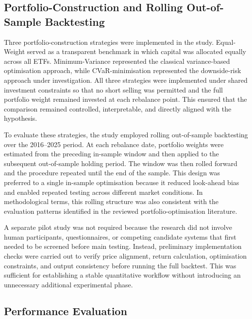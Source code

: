 \subsection{Portfolio-Construction and Rolling Out-of-Sample Backtesting}

\par Three portfolio-construction strategies were implemented in the study. Equal-Weight served as a transparent benchmark in which capital was allocated equally across all ETFs. Minimum-Variance represented the classical variance-based optimisation approach, while CVaR-minimisation represented the downside-risk approach under investigation. All three strategies were implemented under shared investment constraints so that no short selling was permitted and the full portfolio weight remained invested at each rebalance point. This ensured that the comparison remained controlled, interpretable, and directly aligned with the hypothesis.
\par To evaluate these strategies, the study employed rolling out-of-sample backtesting over the 2016–2025 period. At each rebalance date, portfolio weights were estimated from the preceding in-sample window and then applied to the subsequent out-of-sample holding period. The window was then rolled forward and the procedure repeated until the end of the sample. This design was preferred to a single in-sample optimisation because it reduced look-ahead bias and enabled repeated testing across different market conditions. In methodological terms, this rolling structure was also consistent with the evaluation patterns identified in the reviewed portfolio-optimisation literature.
\par A separate pilot study was not required because the research did not involve human participants, questionnaires, or competing candidate systems that first needed to be screened before main testing. Instead, preliminary implementation checks were carried out to verify price alignment, return calculation, optimisation constraints, and output consistency before running the full backtest. This was sufficient for establishing a stable quantitative workflow without introducing an unnecessary additional experimental phase.

\subsection{Performance Evaluation}

